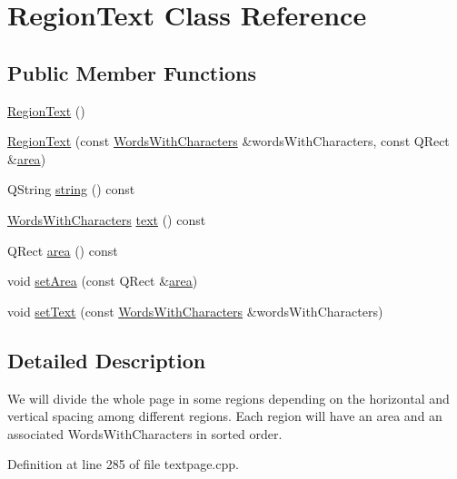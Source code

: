 \hypertarget{classRegionText}{\section{Region\+Text Class Reference}
\label{classRegionText}
}
\subsection*{Public Member Functions}
\begin{DoxyCompactItemize}
\item 
\hyperlink{classRegionText_a386aa1cd5c3cef2f8054755b804cb5ca}{Region\+Text} ()
\item 
\hyperlink{classRegionText_a0d2c3f70d57b8036dd2fc2f6420a3d39}{Region\+Text} (const \hyperlink{textpage_8cpp_ad911313b0eb678ed7fadf84147e4d1d3}{Words\+With\+Characters} \&words\+With\+Characters, const Q\+Rect \&\hyperlink{classRegionText_acf55f2ab455e66f01c09bd7d35ac4a48}{area})
\item 
Q\+String \hyperlink{classRegionText_a0d039ee65ab4abe11753e0f6cbb15d58}{string} () const 
\item 
\hyperlink{textpage_8cpp_ad911313b0eb678ed7fadf84147e4d1d3}{Words\+With\+Characters} \hyperlink{classRegionText_a57a630a26401ff61192e66eebbd163f0}{text} () const 
\item 
Q\+Rect \hyperlink{classRegionText_acf55f2ab455e66f01c09bd7d35ac4a48}{area} () const 
\item 
void \hyperlink{classRegionText_a160848f949f344013a99195b664c83ec}{set\+Area} (const Q\+Rect \&\hyperlink{classRegionText_acf55f2ab455e66f01c09bd7d35ac4a48}{area})
\item 
void \hyperlink{classRegionText_ae8c5a639fec0e060eacb4247cb726da9}{set\+Text} (const \hyperlink{textpage_8cpp_ad911313b0eb678ed7fadf84147e4d1d3}{Words\+With\+Characters} \&words\+With\+Characters)
\end{DoxyCompactItemize}


\subsection{Detailed Description}
We will divide the whole page in some regions depending on the horizontal and vertical spacing among different regions. Each region will have an area and an associated Words\+With\+Characters in sorted order. 

Definition at line 285 of file textpage.\+cpp.



